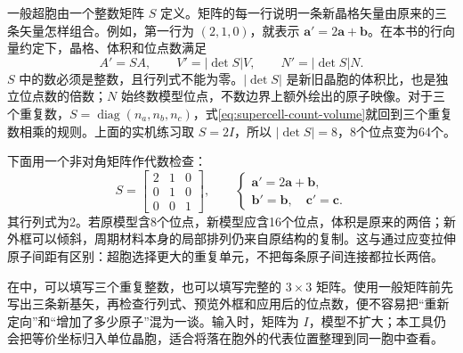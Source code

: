 一般超胞由一个整数矩阵 $S$ 定义。矩阵的每一行说明一条新晶格矢量由原来的三条矢量怎样组合。例如，第一行为 $(2,1,0)$，就表示 $\mathbf a'=2\mathbf a+\mathbf b$。在本书的行向量约定下，晶格、体积和位点数满足
\begin{equation}
 A'=SA,\qquad V'=|\det S|V,\qquad N'=|\det S|N.
 \label{eq:supercell-count-volume}
\end{equation}
$S$ 中的数必须是整数，且行列式不能为零。$|\det S|$ 是新旧晶胞的体积比，也是独立位点数的倍数；$N$ 始终数模型位点，不数边界上额外绘出的原子映像。对于三个重复数，$S=\operatorname{diag}(n_a,n_b,n_c)$，式\eqref{eq:supercell-count-volume}就回到三个重复数相乘的规则。上面的实机练习取 $S=2I$，所以 $|\det S|=8$，8个位点变为64个。

下面用一个非对角矩阵作代数检查：
\[
 S=\begin{bmatrix}2&1&0\\0&1&0\\0&0&1\end{bmatrix},\qquad
 \begin{cases}
 \mathbf a'=2\mathbf a+\mathbf b,\\
 \mathbf b'=\mathbf b,\quad \mathbf c'=\mathbf c.
 \end{cases}
\]
其行列式为2。若原模型含8个位点，新模型应含16个位点，体积是原来的两倍；新外框可以倾斜，周期材料本身的局部排列仍来自原结构的复制。这与通过应变拉伸原子间距有区别：超胞选择更大的重复单元，不把每条原子间连接都拉长两倍。

在中，可以填写三个重复整数，也可以填写完整的 $3\times3$ 矩阵。使用一般矩阵前先写出三条新基矢，再检查行列式、预览外框和应用后的位点数，便不容易把“重新定向”和“增加了多少原子”混为一谈。输入时，矩阵为 $I$，模型不扩大；本工具仍会把等价坐标归入单位晶胞，适合将落在胞外的代表位置整理到同一胞中查看。
